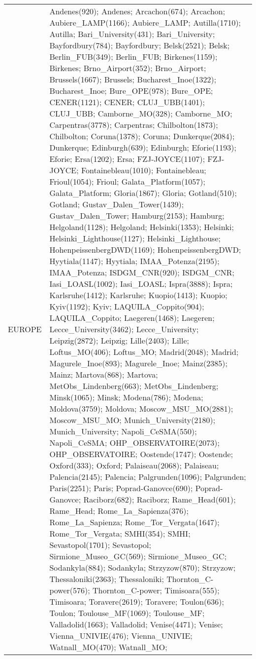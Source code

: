 \documentclass[journal abbreviation, manuscript]{copernicus}
\begin{document}
\begin{table}
\begin{tabularx}{\textwidth}{lX}
                                                                                                                                                                                                                                                                                                                                                                                                                                                                                                                                                                                                          \\
  \middlehline
  EUROPE    & Andenes(920); Andenes; Arcachon(674); Arcachon; Aubiere\_LAMP(1166); Aubiere\_LAMP; Autilla(1710); Autilla; Bari\_University(431); Bari\_University; Bayfordbury(784); Bayfordbury; Belsk(2521); Belsk; Berlin\_FUB(349); Berlin\_FUB; Birkenes(1159); Birkenes; Brno\_Airport(352); Brno\_Airport; Brussels(1667); Brussels; Bucharest\_Inoe(1322); Bucharest\_Inoe; Bure\_OPE(978); Bure\_OPE; CENER(1121); CENER; CLUJ\_UBB(1401); CLUJ\_UBB; Camborne\_MO(328); Camborne\_MO; Carpentras(3778); Carpentras; Chilbolton(1873); Chilbolton; Coruna(1378); Coruna; Dunkerque(2084); Dunkerque; Edinburgh(639); Edinburgh; Eforie(1193); Eforie; Ersa(1202); Ersa; FZJ-JOYCE(1107); FZJ-JOYCE; Fontainebleau(1010); Fontainebleau; Frioul(1054); Frioul; Galata\_Platform(1057); Galata\_Platform; Gloria(1867); Gloria; Gotland(510); Gotland; Gustav\_Dalen\_Tower(1439); Gustav\_Dalen\_Tower; Hamburg(2153); Hamburg; Helgoland(1128); Helgoland; Helsinki(1353); Helsinki; Helsinki\_Lighthouse(1127); Helsinki\_Lighthouse; HohenpeissenbergDWD(1169); HohenpeissenbergDWD; Hyytiala(1147); Hyytiala; IMAA\_Potenza(2195); IMAA\_Potenza; ISDGM\_CNR(920); ISDGM\_CNR; Iasi\_LOASL(1002); Iasi\_LOASL; Ispra(3888); Ispra; Karlsruhe(1412); Karlsruhe; Kuopio(1413); Kuopio; Kyiv(1192); Kyiv; LAQUILA\_Coppito(904); LAQUILA\_Coppito; Laegeren(1468); Laegeren; Lecce\_University(3462); Lecce\_University; Leipzig(2872); Leipzig; Lille(2403); Lille; Loftus\_MO(406); Loftus\_MO; Madrid(2048); Madrid; Magurele\_Inoe(893); Magurele\_Inoe; Mainz(2385); Mainz; Martova(868); Martova; MetObs\_Lindenberg(663); MetObs\_Lindenberg; Minsk(1065); Minsk; Modena(786); Modena; Moldova(3759); Moldova; Moscow\_MSU\_MO(2881); Moscow\_MSU\_MO; Munich\_University(2180); Munich\_University; Napoli\_CeSMA(550); Napoli\_CeSMA; OHP\_OBSERVATOIRE(2073); OHP\_OBSERVATOIRE; Oostende(1747); Oostende; Oxford(333); Oxford; Palaiseau(2068); Palaiseau; Palencia(2145); Palencia; Palgrunden(1096); Palgrunden; Paris(2251); Paris; Poprad-Ganovce(690); Poprad-Ganovce; Raciborz(682); Raciborz; Rame\_Head(601); Rame\_Head; Rome\_La\_Sapienza(376); Rome\_La\_Sapienza; Rome\_Tor\_Vergata(1647); Rome\_Tor\_Vergata; SMHI(354); SMHI; Sevastopol(1701); Sevastopol; Sirmione\_Museo\_GC(569); Sirmione\_Museo\_GC; Sodankyla(884); Sodankyla; Strzyzow(870); Strzyzow; Thessaloniki(2363); Thessaloniki; Thornton\_C-power(576); Thornton\_C-power; Timisoara(555); Timisoara; Toravere(2619); Toravere; Toulon(636); Toulon; Toulouse\_MF(1069); Toulouse\_MF; Valladolid(1663); Valladolid; Venise(4471); Venise; Vienna\_UNIVIE(476); Vienna\_UNIVIE; Watnall\_MO(470); Watnall\_MO; 
\end{tabularx}
\end{table}
\end{document}
